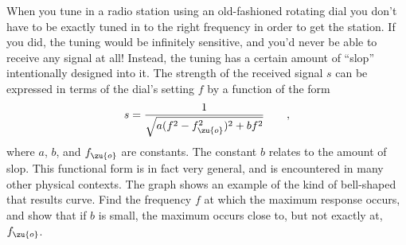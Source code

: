 When you tune in a radio station using an old-fashioned rotating dial you don't have to be
exactly tuned in to the right frequency in order to get the station. If you did, the
tuning would be infinitely sensitive, and you'd never be able to receive any signal at
all! Instead, the tuning has a certain amount of ``slop'' intentionally designed into it.
The strength of the received signal $s$ can be expressed in terms of the dial's setting
$f$ by a function of the form
\begin{equation*}
  s = \frac{1}{\sqrt{a(f^2-f_\zu{o}^2)^2+bf^2}} \qquad ,
\end{equation*}
where $a$, $b$, and $f_\zu{o}$ are constants. The constant $b$ relates to the amount of slop.
This functional form is in fact very general, and
is encountered in many other physical contexts. The graph  shows an example of the kind of
bell-shaped that results curve.
Find the frequency $f$ at which the maximum response occurs, and show that if $b$ is small,
the maximum occurs close to, but not exactly at, $f_\zu{o}$.
